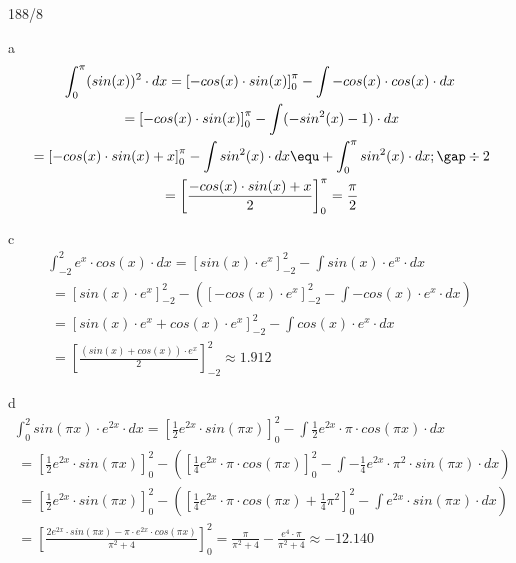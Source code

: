 \begin{exercise}{188/8}
  \item [a]
  \begin{gather*}
    \int_0^\pi (sin(x))^2 \cdot dx = \left[-cos(x) \cdot sin(x)\right]_0^\pi - \int -cos(x) \cdot cos(x) \cdot dx \\
    \;= \left[-cos(x) \cdot sin(x)\right]_0^\pi - \int (-sin^2(x) - 1) \cdot dx \\
    \;= \left[-cos(x) \cdot sin(x) + x\right]_0^\pi - \int sin^2(x) \cdot dx \equ + \int_0^\pi sin^2(x) \cdot dx; \gap \div 2 \\
    \;= \left[\frac{-cos(x) \cdot sin(x) + x}{2}\right]_0^\pi = \frac{\pi}{2}
  \end{gather*}
  \item [c]
  \begin{gather*}
    \int_{-2}^2 e^x \cdot cos(x) \cdot dx = \left[sin(x) \cdot e^x\right]_{-2}^2 - \int sin(x) \cdot e^x \cdot dx \\
    \;= \left[sin(x) \cdot e^x\right]_{-2}^2 - (\left[-cos(x) \cdot e^x\right]_{-2}^2 - \int -cos(x) \cdot e^x \cdot dx) \\
    \;= \left[sin(x) \cdot e^x + cos(x) \cdot e^x\right]_{-2}^2 - \int cos(x) \cdot e^x \cdot dx \\
    \;= \left[\frac{(sin(x) + cos(x)) \cdot e^x}{2}\right]_{-2}^2 \approx 1.912
  \end{gather*}
  \item [d]
  \begin{gather*}
    \int_0^2 sin(\pi x) \cdot e^{2x} \cdot dx = \left[\frac{1}{2}e^{2x} \cdot sin(\pi x)\right]_0^2 - \int \frac{1}{2}e^{2x} \cdot \pi \cdot cos(\pi x) \cdot dx \\
    \;= \left[\frac{1}{2}e^{2x} \cdot sin(\pi x)\right]_0^2 - (\left[\frac{1}{4}e^{2x} \cdot \pi \cdot cos(\pi x)\right]_0^2 - \int -\frac{1}{4}e^{2x} \cdot \pi^2 \cdot sin(\pi x) \cdot dx) \\
    \;= \left[\frac{1}{2}e^{2x} \cdot sin(\pi x)\right]_0^2 - (\left[\frac{1}{4}e^{2x} \cdot \pi \cdot cos(\pi x) + \frac{1}{4}\pi^2\right]_0^2 - \int e^{2x} \cdot sin(\pi x) \cdot dx) \\
    \;= \left[\frac{2e^{2x} \cdot sin(\pi x) - \pi \cdot e^{2x} \cdot cos(\pi x)}{\pi^2 + 4}\right]_0^2 = \frac{\pi}{\pi^2 + 4} - \frac{e^4 \cdot \pi}{\pi^2 + 4} \approx -12.140
  \end{gather*}
\end{exercise}
